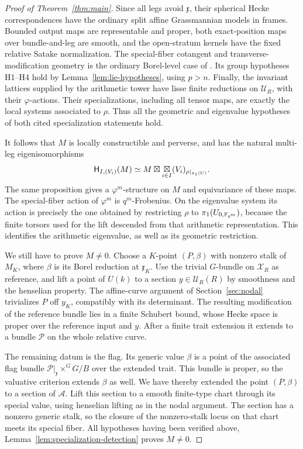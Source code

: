 \begin{proof}[Proof of Theorem~\ref{thm:main}]
Since all legs avoid $\mathfrak x$, their spherical Hecke
correspondences have the ordinary split affine Grassmannian
models in frames.  Bounded output maps are representable and
proper, both exact-position maps over bundle-and-leg are smooth,
and the open-stratum kernels have the fixed relative Satake
normalization.  The special-fiber cotangent and
transverse-modification geometry is the ordinary Borel-level
case of \cite[Section~3]{CT}.  Its group hypotheses H1--H4 hold
by Lemma~\ref{lem:lie-hypotheses}, using $p>n$.
Finally, the invariant lattices supplied by the arithmetic tower
have lisse finite reductions on $\mathscr U_R$, with their
$\varphi$-actions.  Their specializations, including all tensor
maps, are exactly the local systems associated to $\rho$.
Thus all the geometric and eigenvalue hypotheses of both cited
specialization statements hold.

It follows that $M$ is locally constructible and perverse, and
has the natural multi-leg eigenisomorphisms
\begin{equation}\label{eq:final-eigen}
 \mathsf H_{I,(V_i)}(M)
 \simeq M\boxtimes
                 \mathop{\boxtimes}_{i\in I}(V_i)_{\rho|_{\pi_1(U)}}.
\end{equation}
The same proposition gives a $\varphi^m$-structure on $M$ and
equivariance of these maps.  The special-fiber action of
$\varphi^m$ is $q^m$-Frobenius.  On the eigenvalue system its
action is precisely the one obtained by restricting
$\rho$ to $\pi_1(U_{0,\mathbb F_{q^m}})$, because the finite torsors used
for the lift descended from that arithmetic representation.
This identifies the arithmetic eigenvalue, as well as its
geometric restriction.

We still have to prove $M\ne0$.  Choose a $K$-point $(P,\beta)$
with nonzero stalk of $M_K$, where $\beta$ is its Borel reduction
at $\mathfrak x_K$.  Use the trivial $G$-bundle on $\mathscr X_R$
as reference, and lift a point of $U(k)$ to a section
$y\in\mathscr U_R(R)$ by smoothness and the henselian property.
The affine-curve argument of Section~\ref{sec:nodal} trivializes
$P$ off $y_K$, compatibly with its determinant.  The resulting
modification of the reference bundle lies in a finite Schubert
bound, whose Hecke space is proper over the reference input and
$y$.  After a finite trait extension it extends to a bundle
$\mathscr P$ on the whole relative curve.

The remaining datum is the flag.  Its generic value $\beta$ is a
point of the associated flag bundle
$\mathscr P|_{\mathfrak x}\times^G G/B$ over the extended trait.
This bundle is proper, so the valuative criterion extends
$\beta$ as well.  We have thereby extended the point
$(P,\beta)$ to a section of $\mathscr A$.  Lift this section to a
smooth finite-type chart through its special value, using
henselian lifting as in the nodal argument.  The section has a
nonzero generic stalk, so the closure of the nonzero-stalk locus
on that chart meets its special fiber.  All hypotheses having
been verified above, Lemma~\ref{lem:specialization-detection}
proves $M\ne0$.


\end{proof}

